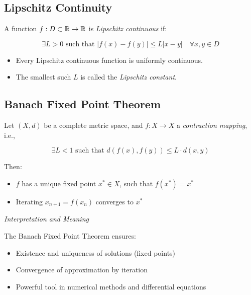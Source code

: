 \subsection{Lipschitz Continuity}

A function \(f: D \subset \mathbb{R} \to \mathbb{R}\) is \emph{Lipschitz continuous} if:

\[
    \exists L > 0 \text{ such that } |f(x) - f(y)| \le L |x - y| \quad \forall x, y \in D
\]

\begin{itemize}

    \item Every Lipschitz continuous function is uniformly continuous.

    \item The smallest such \(L\) is called the \emph{Lipschitz constant}.

\end{itemize}

\subsection{Banach Fixed Point Theorem}

Let \((X, d)\) be a complete metric space, and \(f: X \to X\) a \emph{contraction mapping}, i.e.,

\[
    \exists L < 1 \text{ such that } d(f(x), f(y)) \le L \cdot d(x, y)
\]

Then:

\begin{itemize}

    \item \(f\) has a unique fixed point \(x^* \in X\), such that \(f(x^*) = x^*\)

    \item Iterating \(x_{n+1} = f(x_n)\) converges to \(x^*\)

\end{itemize}

\emph{Interpretation and Meaning}

The Banach Fixed Point Theorem ensures:

\begin{itemize}

    \item Existence and uniqueness of solutions (fixed points)

    \item Convergence of approximation by iteration

    \item Powerful tool in numerical methods and differential equations

\end{itemize}

